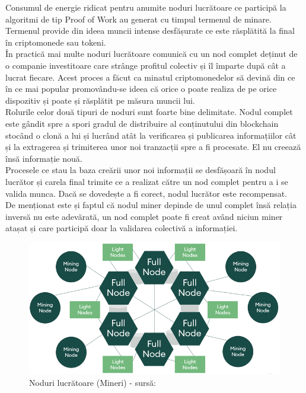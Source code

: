\begin{enumerate}
    Consumul de energie ridicat pentru anumite noduri lucrătoare ce participă la algoritmi de tip Proof of Work au generat cu timpul termenul de minare. Termenul provide din ideea muncii intense desfășurate ce este răsplătită la final în criptomonede sau tokeni.\\
    
    În practică mai multe noduri lucrătoare comunică cu un nod complet deținut de o companie investitoare care strânge profitul colectiv  și îl împarte după cât a lucrat fiecare. Acest proces a făcut ca minatul criptomonedelor să devină din ce în ce mai popular promovându-se ideea că orice o poate realiza de pe orice dispozitiv și poate și răsplătit pe măsura muncii lui.\\
    
    Rolurile celor două tipuri de noduri sunt foarte bine delimitate. 
    Nodul complet este gândit spre a spori gradul de distribuire al conținutului din blockchain stocând o clonă a lui și lucrând atât la verificarea și publicarea informațiilor cât și la extragerea și trimiterea unor noi tranzacții spre a fi procesate. El nu creează însă informație nouă.\\
    
    Procesele ce stau la baza creării unor noi informații se desfășoară în nodul lucrător și carela final trimite ce a realizat către un nod complet pentru a i se valida munca. Dacă se dovedește a fi corect, nodul lucrător este recompensat.\\
    
    De menționat este și faptul că nodul miner depinde de unul complet însă relația inversă nu este adevărată, un nod complet poate fi creat având niciun miner atașat și care participă doar la validarea colectivă a informației.\\
    
    \begin{figure}[H] 
    \centering
    \includegraphics[scale=0.5]{Images/BC_WorkerNodes.png}
    \caption{Noduri lucrătoare (Mineri)  - sursă: \cite{Blockchain_Node_Types}}
    \end{figure}
    
\end{enumerate}

